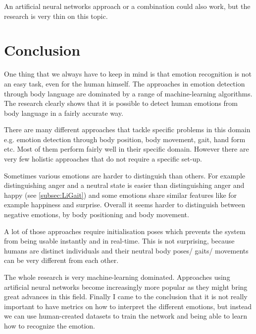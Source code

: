 \documentclass[conference]{IEEEtran}
\begin{document}
An artificial neural networks approach or a combination could also work, but the research is very thin on this topic\cite{janssen2008recognition,karg2012pattern}.



\section{Conclusion}
One thing that we always have to keep in mind is that emotion recognition is not an easy task, even for the human himself\cite{ekman1974detecting,karg2012pattern,schindler2008recognizing}. The approaches in emotion detection through body language are dominated by a range of machine-learning algorithms. The research clearly shows that it is possible to detect human emotions from body language in a fairly accurate way.

There are many different approaches that tackle specific problems in this domain e.g. emotion detection through body position, body movement, gait, hand form etc. Most of them perform fairly well in their specific domain. However there are very few holistic approaches that do not require a specific set-up.

Sometimes various emotions are harder to distinguish than others. For example distinguishing anger and a neutral state is easier than distinguishing anger and happy\cite{li2016emotion} (see \autoref{subsec:LiGait}) and some emotions share similar features like for example happiness and surprise\cite{kleinsmith2005incremental}. Overall it seems harder to distinguish between negative emotions, by body positioning and body movement\cite{schindler2008recognizing}. 

A lot of those approaches require initialisation poses\cite{li2016emotion,cui2016emotion,mccoll2012affect,singh2015edbl} which prevents the system from being usable instantly and in real-time. This is not surprising, because humans are distinct individuals and their neutral body poses/ gaits/ movements can be very different from each other.\

The whole research is very machine-learning dominated. Approaches using artificial neural networks become increasingly more popular\cite{cao2017realtime} as they might bring great advances in this field. Finally I came to the conclusion that it is not really important to have metrics on how to interpret the different emotions, but instead we can use human-created datasets to train the network and being able to learn how to recognize the emotion.
\end{document}
